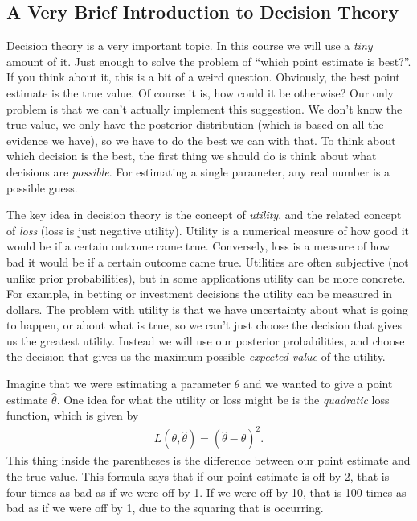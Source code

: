 \subsection{A Very Brief Introduction to Decision Theory}
Decision theory is a very important topic. In this course we will use a
{\it tiny} amount of it. Just enough to solve the problem of ``which point
estimate is best?''. If you think about it, this is a bit of a weird question.
Obviously, the best point estimate is the true value. Of course it is, how could it
be otherwise? Our only problem is that we can't actually implement this suggestion.
We don't know the true value, we only have the posterior distribution
(which is based on all the evidence we have), so we have to do 
the best we can with that. To think about which decision is the best,
the first thing we should do is think
about what decisions are {\it possible}. For estimating a single parameter, any
real number is a possible guess.

The key idea in decision theory is the concept of {\it utility}, and the related
concept of {\it loss} (loss is just negative utility). Utility is
a numerical measure of how good it would be if a certain outcome came true.
Conversely, loss is a measure of how bad it would be if a certain outcome
came true.
Utilities are often subjective (not unlike prior probabilities), but in some
applications utility can be more concrete. For example, in betting or investment
decisions the utility can be measured in dollars. The problem with utility is
that we have uncertainty about what is going to happen, or about what is true,
so we can't just choose the decision that gives us the greatest utility. Instead
we will use our posterior probabilities, and choose the decision that gives us
the maximum possible {\it expected value} of the utility.

Imagine that we were estimating a parameter $\theta$ and we wanted to give a
point estimate $\hat{\theta}$. One idea for what the utility or loss might be is the
{\it quadratic} loss function, which is given by
\begin{eqnarray}
L(\theta, \hat{\theta}) = \left(\hat{\theta} - \theta\right)^2.
\end{eqnarray}
This thing inside the parentheses is the difference between our point estimate
and the true value. This formula says that if our point estimate is off by 2,
that is four times as bad as if we were off by 1. If we were off by 10, that is
100 times as bad as if we were off by 1, due to the squaring that is occurring.

